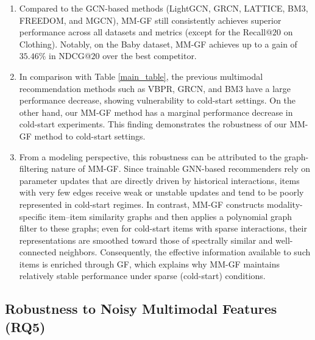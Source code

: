 \documentclass[a4paper,fleqn]{cas-sc}
\renewcommand{\cite}{\citep}
\begin{document}
\begin{enumerate}[label=(\roman*)]
    \item  Compared to the GCN-based methods (LightGCN, GRCN, LATTICE, BM3, FREEDOM, and MGCN), \textsf{MM-GF} still consistently achieves superior performance across all datasets and metrics (except for the Recall@$20$ on Clothing). Notably, on the Baby dataset, \textsf{MM-GF} achieves up to a gain of $35.46\%$ in NDCG@$20$ over the best competitor.
    
    \item  In comparison with Table \ref{main_table}, the previous multimodal recommendation methods such as VBPR, GRCN, and BM3 have a large performance decrease, showing vulnerability to cold-start settings. On the other hand, our \textsf{MM-GF} method has a marginal performance decrease in cold-start experiments. This finding demonstrates the robustness of our \textsf{MM-GF} method to cold-start settings.

    \item From a modeling perspective, this robustness can be attributed to the graph-filtering nature of \textsf{MM-GF}. Since trainable GNN-based recommenders \cite{DBLP:conf/aaai/HeM16, DBLP:conf/mm/WeiWN0C20, DBLP:conf/mm/Zhang00WWW21, DBLP:conf/www/ZhouZLZMWYJ23, DBLP:conf/mm/ZhouS23, DBLP:conf/mm/Yu0LB23} rely on parameter updates that are directly driven by historical interactions, items with very few edges receive weak or unstable updates and tend to be poorly represented in cold-start regimes. In contrast, \textsf{MM-GF} constructs modality-specific item--item similarity graphs and then applies a polynomial graph filter to these graphs; even for cold-start items with sparse interactions, their representations are smoothed toward those of spectrally similar and well-connected neighbors. Consequently, the effective information available to such items is enriched through GF, which explains why \textsf{MM-GF} maintains relatively stable performance under sparse (cold-start) conditions.
\end{enumerate}


\subsection{Robustness to Noisy Multimodal Features (RQ5)}
\label{Robustness noise}
\end{document}
